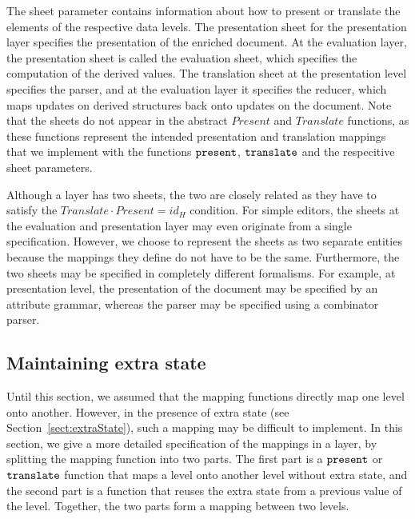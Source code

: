 The sheet parameter contains information about how to present or translate the elements of the respective data levels. The presentation sheet for the presentation layer specifies the presentation of the enriched document. At the evaluation layer, the presentation sheet is called the evaluation sheet, which specifies the computation of the derived values. The translation sheet at the presentation level specifies the parser, and at the evaluation layer it specifies the reducer, which maps updates on derived structures back onto updates on the document. Note that the sheets do not appear in the abstract $Present$ and $Translate$ functions, as these functions represent the intended presentation and translation mappings that we implement with the functions 
${\tt present}$, ${\tt translate}$ and the respecitive sheet parameters.

Although a layer has two sheets, the two are closely related as they have to satisfy the
$Translate \cdot Present = id_{H}$ condition. For simple editors, the sheets at the evaluation and presentation layer may even originate from a single specification. However, we choose to represent the sheets as two separate entities because the mappings they define do not have to be the same.  Furthermore, the two sheets may be specified in completely different formalisms. For example, at presentation level, the presentation of the document may be specified by an attribute grammar, whereas the parser may be specified using a combinator parser\cite{combinatorparser}.



%																
%																
%																
\subsection{Maintaining extra state} \label{sect:maintainingExtraState}

Until this section, we assumed that the mapping functions directly map one level onto another. However, in the presence of extra state (see Section~\ref{sect:extraState}), such a mapping may be difficult to implement. In this section, we give a more detailed specification of the mappings in a layer, by splitting the mapping function into two parts. The first part is a ${\tt present}$ or ${\tt translate}$ function that maps a level onto another level without extra state, and the second part is a function that reuses the extra state from a previous value of the level. Together, the two parts form a mapping between two levels.

